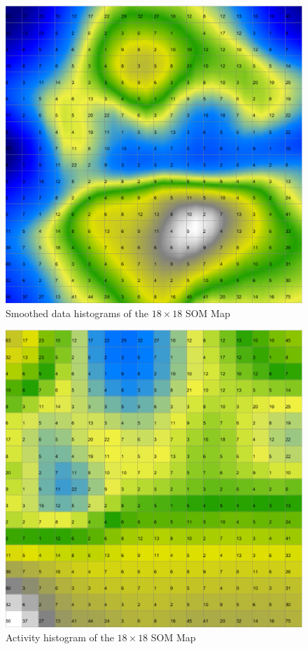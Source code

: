 \documentclass{acm_proc_article-sp}
\begin{document}
\begin{figure}
\centering
\includegraphics[width=\linewidth]{img/wine-mid-smoothed-data-histogram}
\caption{Smoothed data histograms of the $18\times18$ SOM Map}
\label{fig:wine-mid-smoothed-data-histogram}
\end{figure}

\begin{figure}
\centering
\includegraphics[width=\linewidth]{img/wine-mid-activity-histogram}
\caption{Activity histogram of the $18\times18$ SOM Map}
\label{fig:wine-mid-activity-histogram}
\end{figure}








\end{document}
